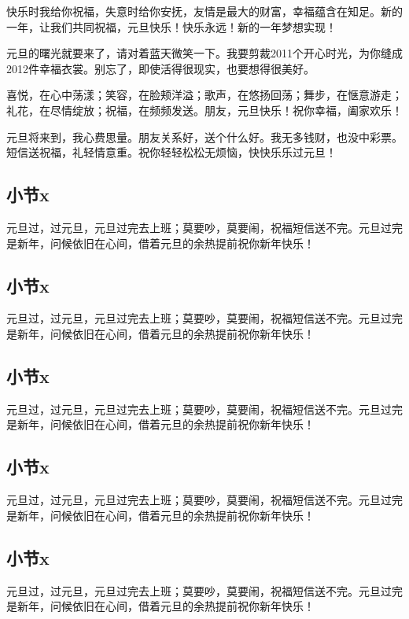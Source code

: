 快乐时我给你祝福，失意时给你安抚，友情是最大的财富，幸福蕴含在知足。新的一年，让我们共同祝福，元旦快乐！快乐永远！新的一年梦想实现！

元旦的曙光就要来了，请对着蓝天微笑一下。我要剪裁2011个开心时光，为你缝成2012件幸福衣裳。别忘了，即使活得很现实，也要想得很美好。

喜悦，在心中荡漾；笑容，在脸颊洋溢；歌声，在悠扬回荡；舞步，在惬意游走；礼花，在尽情绽放；祝福，在频频发送。朋友，元旦快乐！祝你幸福，阖家欢乐！

元旦将来到，我心费思量。朋友关系好，送个什么好。我无多钱财，也没中彩票。短信送祝福，礼轻情意重。祝你轻轻松松无烦恼，快快乐乐过元旦！

\subsection{小节x}

元旦过，过元旦，元旦过完去上班；莫要吵，莫要闹，祝福短信送不完。元旦过完是新年，问候依旧在心间，借着元旦的余热提前祝你新年快乐！

\subsection{小节x}

元旦过，过元旦，元旦过完去上班；莫要吵，莫要闹，祝福短信送不完。元旦过完是新年，问候依旧在心间，借着元旦的余热提前祝你新年快乐！

\subsection{小节x}

元旦过，过元旦，元旦过完去上班；莫要吵，莫要闹，祝福短信送不完。元旦过完是新年，问候依旧在心间，借着元旦的余热提前祝你新年快乐！

\subsection{小节x}

元旦过，过元旦，元旦过完去上班；莫要吵，莫要闹，祝福短信送不完。元旦过完是新年，问候依旧在心间，借着元旦的余热提前祝你新年快乐！

\subsection{小节x}

元旦过，过元旦，元旦过完去上班；莫要吵，莫要闹，祝福短信送不完。元旦过完是新年，问候依旧在心间，借着元旦的余热提前祝你新年快乐！

